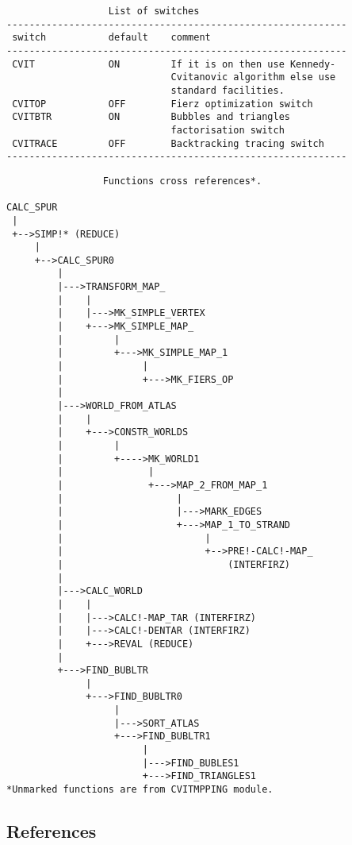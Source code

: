 \begin{verbatim}
                  List of switches
------------------------------------------------------------
 switch           default    comment
------------------------------------------------------------
 CVIT             ON         If it is on then use Kennedy-
                             Cvitanovic algorithm else use
                             standard facilities.
 CVITOP           OFF        Fierz optimization switch
 CVITBTR          ON         Bubbles and triangles
                             factorisation switch
 CVITRACE         OFF        Backtracking tracing switch
------------------------------------------------------------
\end{verbatim}


\begin{verbatim}
                 Functions cross references*.

CALC_SPUR
 |
 +-->SIMP!* (REDUCE)
     |
     +-->CALC_SPUR0
         |
         |--->TRANSFORM_MAP_
         |    |
         |    |--->MK_SIMPLE_VERTEX
         |    +--->MK_SIMPLE_MAP_
         |         |
         |         +--->MK_SIMPLE_MAP_1
         |              |
         |              +--->MK_FIERS_OP
         |
         |--->WORLD_FROM_ATLAS
         |    |
         |    +--->CONSTR_WORLDS
         |         |
         |         +---->MK_WORLD1
         |               |
         |               +--->MAP_2_FROM_MAP_1
         |                    |
         |                    |--->MARK_EDGES
         |                    +--->MAP_1_TO_STRAND
         |                         |
         |                         +-->PRE!-CALC!-MAP_
         |                             (INTERFIRZ)
         |
         |--->CALC_WORLD
         |    |
         |    |--->CALC!-MAP_TAR (INTERFIRZ)
         |    |--->CALC!-DENTAR (INTERFIRZ)
         |    +--->REVAL (REDUCE)
         |
         +--->FIND_BUBLTR
              |
              +--->FIND_BUBLTR0
                   |
                   |--->SORT_ATLAS
                   +--->FIND_BUBLTR1
                        |
                        |--->FIND_BUBLES1
                        +--->FIND_TRIANGLES1
*Unmarked functions are from CVITMPPING module.

\end{verbatim}


\subsection*{References}

